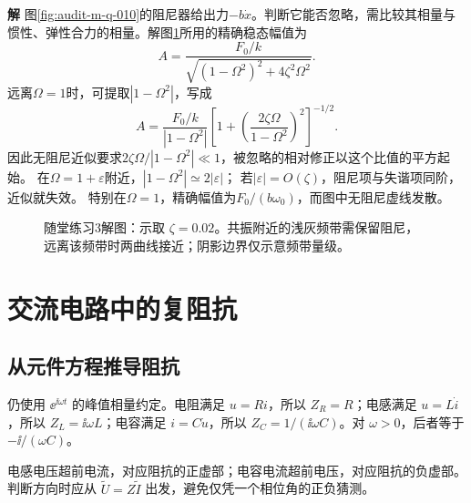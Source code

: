 \documentclass[11pt,openany,fontset=fandol]{ctexbook}
\theoremstyle{plain}\newtheorem{theorem}{定理}[chapter]\newtheorem{proposition}[theorem]{命题}
\theoremstyle{definition}\newtheorem{definition}{定义}[chapter]\newtheorem{example}{例}[chapter]
\theoremstyle{remark}\newtheorem*{remark}{说明}
\newcommand{\SolutionStart}{\par\nobreak\medskip\nobreak\noindent\textbf{解}\quad\ignorespaces}
\newenvironment{solution}{\SolutionStart}{\par\medskip}
\begin{document}

\begin{solution}
图\ref{fig:audit-m-q-010}的阻尼器给出力$-b\dot x$。判断它能否忽略，需比较其相量与惯性、弹性合力的相量。解图\ref{fig:class-1-3}所用的精确稳态幅值为
\[
 A=\frac{F_0/k}{\sqrt{(1-\Omega^2)^2+4\zeta^2\Omega^2}}.
\]
远离$\Omega=1$时，可提取$|1-\Omega^2|$，写成
\[
 A=\frac{F_0/k}{|1-\Omega^2|}
 \left[1+\left(\frac{2\zeta\Omega}{1-\Omega^2}\right)^2\right]^{-1/2}.
\]
因此无阻尼近似要求$2\zeta\Omega/|1-\Omega^2|\ll1$，被忽略的相对修正以这个比值的平方起始。
在$\Omega=1+\varepsilon$附近，$|1-\Omega^2|\simeq2|\varepsilon|$；
若$|\varepsilon|=O(\zeta)$，阻尼项与失谐项同阶，近似就失效。
特别在$\Omega=1$，精确幅值为$F_0/(b\omega_0)$，而图中无阻尼虚线发散。

\begin{figure}[H]\centering
{}
\caption{随堂练习3解图：示取 $\zeta=0.02$。共振附近的浅灰频带需保留阻尼，远离该频带时两曲线接近；阴影边界仅示意频带量级。}\label{fig:class-1-3}
\end{figure}
\end{solution}

\section{交流电路中的复阻抗}
\subsection{从元件方程推导阻抗}
仍使用 $\ee^{\ii\omega t}$ 的峰值相量约定。电阻满足 $u=Ri$，所以 $Z_R=R$；电感满足 $u=L\dot i$，所以 $Z_L=\ii\omega L$；电容满足 $i=C\dot u$，所以 $Z_C=1/(\ii\omega C)$。对 $\omega>0$，后者等于 $-\ii/(\omega C)$。

电感电压超前电流，对应阻抗的正虚部；电容电流超前电压，对应阻抗的负虚部。判断方向时应从 $\widetilde U=Z\widetilde I$ 出发，避免仅凭一个相位角的正负猜测。
\end{document}
